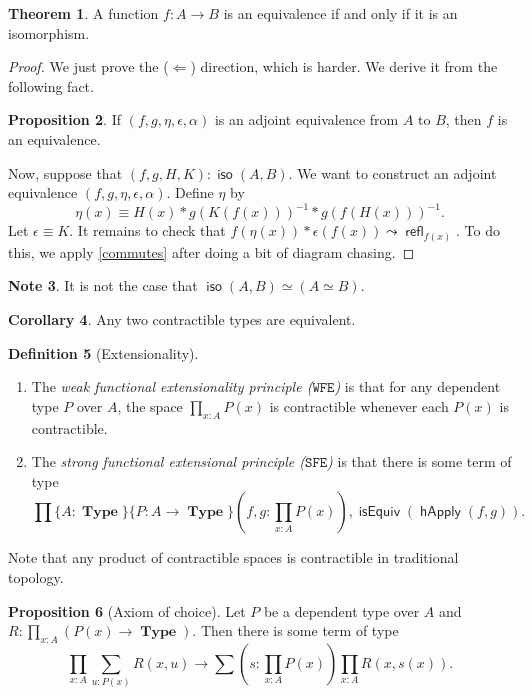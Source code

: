 \documentclass[10pt,letterpaper,cm]{nupset}
\theoremstyle{definition}
\newtheorem{definition}{Definition}[subsection]
\newtheorem{note}[definition]{Note}
\theoremstyle{theorem}
\newtheorem{theorem}[definition]{Theorem}
\newtheorem{prop}[definition]{Proposition}
\newtheorem{corollary}[definition]{Corollary}
\theoremstyle{remark}
\newcommand{\1}{\mathbf{1}}
\newcommand{\wfe}{\mathtt{WFE}}
\newcommand{\sfe}{\mathtt{SFE}}
\newcommand{\0}{\vec 0}
\DeclareMathOperator{\iso}{\mathsf{iso}}
\DeclareMathOperator{\refl}{\mathsf{refl}}
\DeclareMathOperator{\isequiv}{\mathsf{isEquiv}}
\DeclareMathOperator{\happly}{\mathsf{hApply}}
\DeclareMathOperator{\type}{\mathbf{Type}}
\begin{document}
\begin{theorem}
A function $f : A \to B$ is an equivalence if and only if it is an isomorphism.
\end{theorem}
\begin{proof}
We just prove the ($\Longleftarrow$) direction, which is harder. We derive it from the following fact.
\begin{prop}
If $\left(f, g, \eta, \epsilon, \alpha\right)$ is an adjoint equivalence from $A$ to $B$, then $f$ is an equivalence.
\end{prop}
Now, suppose that $\left(f,g,H, K\right): \iso(A,B)$. We want to construct an adjoint equivalence $\left(f, g, \eta,  \epsilon, \alpha\right)$. Define $\eta$ by $$\eta(x) \equiv H(x) \ast g(K(f(x)))^{{-}1} \ast g(f(H(x)))^{{-}1}.$$ Let $\epsilon \equiv K$. 
It remains to check that $f(\eta(x)) \ast \epsilon(f(x)) \leadsto \refl_{f(x)}$.
To do this, we apply \cref{commutes} after doing a bit of diagram chasing.
\end{proof}

\begin{note}
It is not the case that $\iso(A,B) \simeq (A \simeq B)$.
\end{note}

\begin{corollary}
Any two contractible types are equivalent. 
\end{corollary}

\begin{definition}[Extensionality] $ $
\begin{enumerate} 
\item The \textit{weak functional extensionality principle ($\wfe$)} is that for any dependent type $P$ over $A$, the space $\prod_{x:A} {P(x)}$ is contractible whenever each $P(x)$ is contractible. 
\item The \textit{strong functional extensional principle ($\sfe$)} is that there is some term of type $$\prod\{A: \type\}\{P: A \to \type\}\left(f,g: \prod_{x:A} P(x)\right), \isequiv(\happly(f,g)).$$
\end{enumerate}
\end{definition}

Note that any product of contractible spaces is contractible in traditional topology. 

\begin{prop}[Axiom of choice]
Let $P$ be a dependent type over $A$ and $R : \prod_{x:A}\left(P(x) \to \type\right)$. Then there is some term of type $$\prod_{x:A}\sum_{u:P(x)} R(x, u) \to \sum\left(s:  \prod_{x:A} P(x)\right) \prod_{x:A}R(x, s(x)) .$$
\end{prop}
\end{document}
